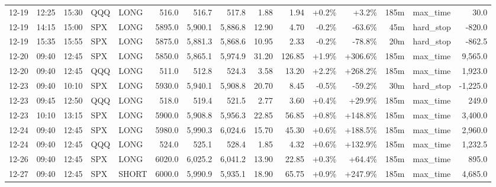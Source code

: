 \documentclass[11pt,a4paper,twoside]{article}
\begin{document}
\begin{landscape}
\begin{center}
\begin{longtable}{>{\color{txtmain}}l l l l l r r r r r r r r >{\color{txtmain}}l r}
12-19 & 12:25 & 15:30 & QQQ & LONG & 516.0 & 516.7 & 517.8 & 1.88 & 1.94 & \textcolor{wingreen}{+0.2\%} & \textcolor{wingreen}{+3.2\%} & 185m & max\_time & \textcolor{wingreen}{30.0} \\
12-19 & 14:15 & 15:00 & SPX & LONG & 5895.0 & 5,900.1 & 5,886.8 & 12.90 & 4.70 & \textcolor{lossred}{-0.2\%} & \textcolor{lossred}{-63.6\%} & 45m & hard\_stop & \textcolor{lossred}{-820.0} \\
12-19 & 15:35 & 15:55 & SPX & LONG & 5875.0 & 5,881.3 & 5,868.6 & 10.95 & 2.33 & \textcolor{lossred}{-0.2\%} & \textcolor{lossred}{-78.8\%} & 20m & hard\_stop & \textcolor{lossred}{-862.5} \\
12-20 & 09:40 & 12:45 & SPX & LONG & 5850.0 & 5,865.1 & 5,974.9 & 31.20 & 126.85 & \textcolor{wingreen}{+1.9\%} & \textcolor{wingreen}{+306.6\%} & 185m & max\_time & \textcolor{wingreen}{9,565.0} \\
12-20 & 09:40 & 12:45 & QQQ & LONG & 511.0 & 512.8 & 524.3 & 3.58 & 13.20 & \textcolor{wingreen}{+2.2\%} & \textcolor{wingreen}{+268.2\%} & 185m & max\_time & \textcolor{wingreen}{1,923.0} \\
12-23 & 09:40 & 10:10 & SPX & LONG & 5930.0 & 5,940.1 & 5,908.8 & 20.70 & 8.45 & \textcolor{lossred}{-0.5\%} & \textcolor{lossred}{-59.2\%} & 30m & hard\_stop & \textcolor{lossred}{-1,225.0} \\
12-23 & 09:45 & 12:50 & QQQ & LONG & 518.0 & 519.4 & 521.5 & 2.77 & 3.60 & \textcolor{wingreen}{+0.4\%} & \textcolor{wingreen}{+29.9\%} & 185m & max\_time & \textcolor{wingreen}{249.0} \\
12-23 & 10:10 & 13:15 & SPX & LONG & 5900.0 & 5,908.8 & 5,956.3 & 22.85 & 56.85 & \textcolor{wingreen}{+0.8\%} & \textcolor{wingreen}{+148.8\%} & 185m & max\_time & \textcolor{wingreen}{3,400.0} \\
12-24 & 09:40 & 12:45 & SPX & LONG & 5980.0 & 5,990.3 & 6,024.6 & 15.70 & 45.30 & \textcolor{wingreen}{+0.6\%} & \textcolor{wingreen}{+188.5\%} & 185m & max\_time & \textcolor{wingreen}{2,960.0} \\
12-24 & 09:40 & 12:45 & QQQ & LONG & 524.0 & 525.1 & 528.4 & 1.85 & 4.32 & \textcolor{wingreen}{+0.6\%} & \textcolor{wingreen}{+132.9\%} & 185m & max\_time & \textcolor{wingreen}{1,232.5} \\
12-26 & 09:40 & 12:45 & SPX & LONG & 6020.0 & 6,025.2 & 6,041.2 & 13.90 & 22.85 & \textcolor{wingreen}{+0.3\%} & \textcolor{wingreen}{+64.4\%} & 185m & max\_time & \textcolor{wingreen}{895.0} \\
12-27 & 09:40 & 12:45 & SPX & SHORT & 6000.0 & 5,990.9 & 5,935.1 & 18.90 & 65.75 & \textcolor{wingreen}{+0.9\%} & \textcolor{wingreen}{+247.9\%} & 185m & max\_time & \textcolor{wingreen}{4,685.0} \\

\end{longtable}
\end{center}
\end{landscape}
\end{document}
